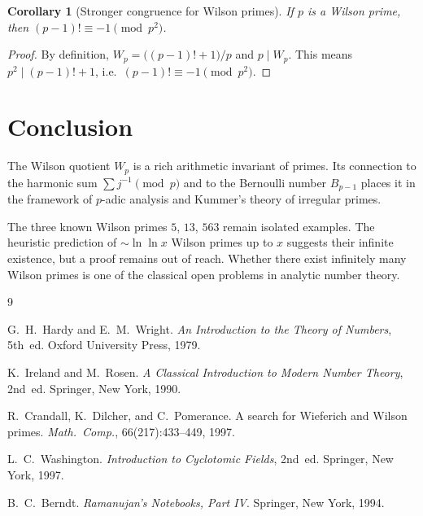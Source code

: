 \documentclass[12pt,a4paper]{amsart}
\newtheorem{corollary}[theorem]{Corollary}
\theoremstyle{definition}
\begin{document}
\begin{corollary}[Stronger congruence for Wilson primes]\label{cor:stronger}
  If $p$ is a Wilson prime, then $(p-1)! \equiv -1 \pmod{p^2}$.
\end{corollary}

\begin{proof}
  By definition, $W_p = \bigl((p-1)!+1\bigr)/p$ and $p \mid W_p$.
  This means $p^2 \mid (p-1)!+1$, i.e.\ $(p-1)! \equiv -1 \pmod{p^2}$.
\end{proof}

\section{Conclusion}

The Wilson quotient $W_p$ is a rich arithmetic invariant of primes.
Its connection to the harmonic sum $\sum j^{-1} \pmod p$ and to the
Bernoulli number $B_{p-1}$ places it in the framework of $p$-adic analysis
and Kummer's theory of irregular primes.

The three known Wilson primes $5$, $13$, $563$ remain isolated examples.
The heuristic prediction of $\sim \ln\ln x$ Wilson primes up to $x$ suggests
their infinite existence, but a proof remains out of reach.
Whether there exist infinitely many Wilson primes is one of the classical
open problems in analytic number theory.

\begin{thebibliography}{9}

G.~H.~Hardy and E.~M.~Wright.
\newblock \emph{An Introduction to the Theory of Numbers}, 5th~ed.
\newblock Oxford University Press, 1979.

K.~Ireland and M.~Rosen.
\newblock \emph{A Classical Introduction to Modern Number Theory}, 2nd~ed.
\newblock Springer, New York, 1990.

R.~Crandall, K.~Dilcher, and C.~Pomerance.
\newblock A search for Wieferich and Wilson primes.
\newblock \emph{Math.\ Comp.}, 66(217):433--449, 1997.

L.~C.~Washington.
\newblock \emph{Introduction to Cyclotomic Fields}, 2nd~ed.
\newblock Springer, New York, 1997.

B.~C.~Berndt.
\newblock \emph{Ramanujan's Notebooks, Part IV}.
\newblock Springer, New York, 1994.

\end{thebibliography}
\end{document}
